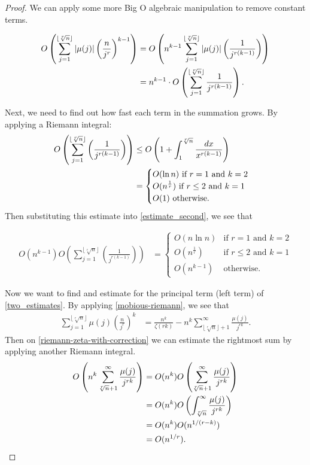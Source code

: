\documentclass[10pt,a4paper]{article}
\theoremstyle{definition}
\theoremstyle{remark}
\begin{document}
\begin{proof}
	We can apply some more Big O algebraic manipulation to remove constant terms.
	
	\begin{align}
	O\left(\sum_{j=1}^{\lfloor\sqrt[r]{n}\rfloor}|\mu(j)|\left(\frac{n}{j^r}\right)^{k-1}\right) 
	& = O\left(n^{k-1}\sum_{j=1}^{\lfloor\sqrt[r]{n}\rfloor}|\mu(j)|\left(\frac{1}{j^{r(k-1)}}\right)\right) \notag\\
	& = n^{k-1} \cdot O\left(\sum_{j=1}^{\lfloor\sqrt[r]{n}\rfloor} \frac{1}{j^{r(k-1)}}\right)\notag. \label{estimate_second}
	\end{align}

	Next, we need to find out how fast each term in the summation grows.
	By applying a Riemann integral:
	\begin{align}
		O\left(\sum_{j=1}^{\lfloor\sqrt[r]{n}\rfloor}\left(\frac{1}{j^{r(k-1)}}\right)\right)&\leq O\left(1+\int_{1}^{\sqrt[r]{n}}\frac{dx}{x^{r(k-1)}}\right) \notag \\
		&= \begin{cases}
			O(\ln n) \text{ if } r=1 \text{ and } k=2\\
			O(n^{\frac{1}{r}}) \text{ if } r\leq 2 \text{ and } k=1\\
			O(1) \text{ otherwise.}
		\end{cases}
	\end{align} 
	Then substituting this estimate into \cref{estimate_second}, we see that 
	
	\begin{align}
	O\left(n^{k-1}\right)O\left(\sum_{j=1}^{\lfloor\sqrt[r]{n}\rfloor}\left(\frac{1}{j^{r(k-1)}}\right)\right) &= \begin{cases}
	O(n\ln n) & \text{if } r=1 \text{ and } k=2\\
	O(n^{\frac{1}{r}}) & \text{if } r\leq 2 \text{ and } k=1\\
	O(n^{k-1}) & \text{otherwise.}
	\end{cases}
	\end{align}

	Now we want to find and estimate for the principal term (left term) of \cref{two_estimates}. By applying  \cref{mobious-riemann}, we see that
	\begin{align}\label{riemann-zeta-with-correction}
		\sum_{j=1}^{\lfloor\sqrt[r]{n}\rfloor}\mu(j)\left(\frac{n}{j^r}\right)^k &= \frac{n^k}{\zeta(rk)} - n^k\sum_{\lfloor \sqrt[r]{n} \rfloor + 1}^\infty \frac{\mu(j)}{j^{rk}}.
	\end{align}
	Then on \cref{riemann-zeta-with-correction} we can estimate the rightmost sum by applying another Riemann integral. 
	\begin{align}
		O\left(n^k\sum_{\sqrt[r]{n}+1}^\infty \frac{\mu(j)}{j^{rk}}\right) &= O(n^k)O\left(\sum_{\sqrt[r]{n}+1}^\infty \frac{\mu(j)}{j^{rk}}\right)\notag\\
		&= O(n^k)O\left(\int_{\sqrt[r]{n}}^{\infty}\frac{\mu(j)}{j^{rk}}\right)\notag\\
		&=O(n^k)O(n^{{1}/(r-k)})\notag\\
		&=O(n^{{1}/r}).
	\end{align} 


\end{proof}
\end{document}
